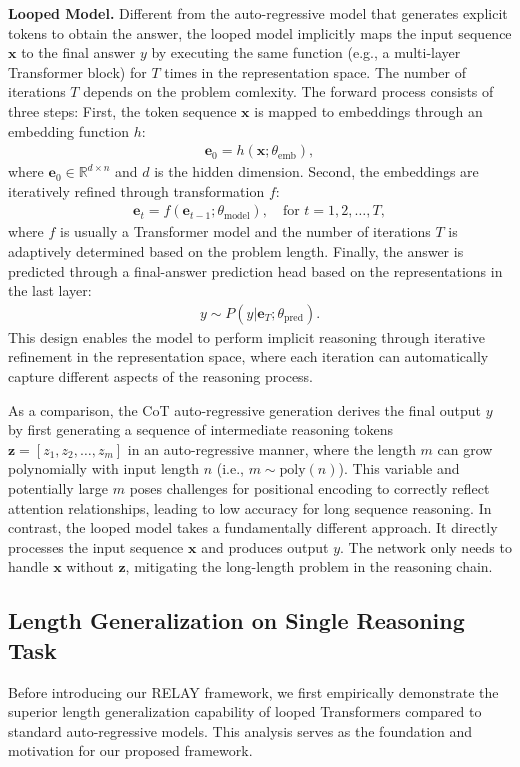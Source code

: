 \textbf{Looped Model. } Different from the auto-regressive model that generates explicit tokens to obtain the answer, the looped model implicitly maps the input sequence \( \bm{x} \) to the final answer \( y \) by executing the same function (e.g., a multi-layer Transformer block) for \( T \) times in the representation space. The number of iterations \( T \) depends on the problem comlexity. The forward process consists of three steps:
First, the token sequence \(\bm{x}\) is mapped to embeddings through an embedding function \(h\):
\begin{align}
\bm{e}_0 = h(\bm{x}; \theta_{\text{emb}}),
\end{align}
where \(\bm{e}_0 \in \mathbb{R}^{d\times n}\) and \(d\) is the hidden dimension. Second, the embeddings are iteratively refined through  transformation \(f\):
\begin{align}
\bm{e}_t = f(\bm{e}_{t-1}; \theta_{\text{model}}), \quad \text{for } t = 1, 2, \ldots, T,
\end{align}
where $f$ is usually a Transformer model and the number of iterations \(T\) is adaptively determined based on the problem length. Finally, the answer is predicted through a final-answer prediction head based on the representations in the last layer:
\begin{align}
y \sim P(y|\bm{e}_T; \theta_{\text{pred}}).
\end{align}
This design enables the model to perform implicit reasoning through iterative refinement in the representation space, where each iteration can automatically capture different aspects of the reasoning process. 

As a comparison, the CoT auto-regressive generation derives the final output \( y \) by first generating a sequence of intermediate reasoning tokens \( \bm{z} = [z_1, z_2, \ldots, z_m] \) in an auto-regressive manner, where the length $m$ can grow polynomially with input length \(n\) (i.e., \(m \sim \text{poly}(n)\)). This variable and potentially large \(m\) poses challenges for positional encoding to correctly reflect attention relationships, leading to low accuracy for long sequence reasoning. In contrast, the looped model takes a fundamentally different approach. It directly processes the input sequence \(\bm{x}\) and produces output \(y\). The network only needs to handle \(\bm{x}\) without \( \bm{z}\), mitigating the long-length problem in the reasoning chain.

\subsection{Length Generalization on Single Reasoning Task}\label{sec:single_task}
Before introducing our RELAY framework, we first empirically demonstrate the superior length generalization capability of looped Transformers compared to standard auto-regressive models. This  analysis serves as the foundation and motivation for our proposed framework. 


